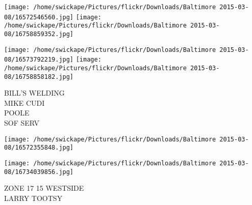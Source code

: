 \documentclass[10pt,letterpaper]{article}
\begin{document}
\texttt{[image: /home/swickape/Pictures/flickr/Downloads/Baltimore 2015-03-08/16572546560.jpg]}
\texttt{[image: /home/swickape/Pictures/flickr/Downloads/Baltimore 2015-03-08/16758859352.jpg]}

\texttt{[image: /home/swickape/Pictures/flickr/Downloads/Baltimore 2015-03-08/16573792219.jpg]}
\texttt{[image: /home/swickape/Pictures/flickr/Downloads/Baltimore 2015-03-08/16758858182.jpg]}

BILL'S WELDING\\
MIKE CUDI\\
POOLE\\
SOF SERV\\
\pagebreak

\texttt{[image: /home/swickape/Pictures/flickr/Downloads/Baltimore 2015-03-08/16572355848.jpg]}

\vspace{0.25in}
\texttt{[image: /home/swickape/Pictures/flickr/Downloads/Baltimore 2015-03-08/16734039856.jpg]}

ZONE 17 15 WESTSIDE\\
LARRY TOOTSY\\
\pagebreak
\end{document}
